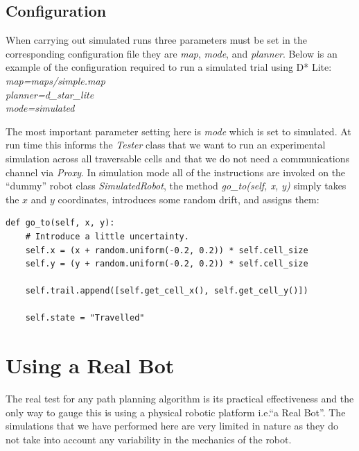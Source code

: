 \subsection{Configuration}
\noindent 
When carrying out simulated runs three parameters must be set in the corresponding configuration file they are \textit{map}, \textit{mode}, and \textit{planner}. Below is an example of the configuration required to run a simulated trial using D* Lite: \\

	\indent \textit{map=maps/simple.map \\}
	\indent \textit{planner=d\_star\_lite \\}
	\indent \textit{mode=simulated \\}

\noindent
The most important parameter setting here is \textit{mode} which is set to simulated. At run time this informs the \textit{Tester} class that we want to run an experimental simulation across all traversable cells and that we do not need a communications channel via \textit{Proxy}. In simulation mode all of the instructions are invoked on the ``dummy'' robot class \textit{SimulatedRobot}, the method \textit{go\_to(self, x, y)} simply takes the $x$ and $y$ coordinates, introduces some random drift, and assigns them: \\

\begin{lstlisting}
def go_to(self, x, y):
	# Introduce a little uncertainty.
    self.x = (x + random.uniform(-0.2, 0.2)) * self.cell_size  
    self.y = (y + random.uniform(-0.2, 0.2)) * self.cell_size
    
    self.trail.append([self.get_cell_x(), self.get_cell_y()])
    
    self.state = "Travelled"
\end{lstlisting}


\section{Using a Real Bot}
\noindent
The real test for any path planning algorithm is its practical effectiveness and the only way to gauge this is using a physical robotic platform i.e.``a Real Bot''. The simulations that we have performed here are very limited in nature as they do not take into account any variability in the mechanics of the robot. \\
  
